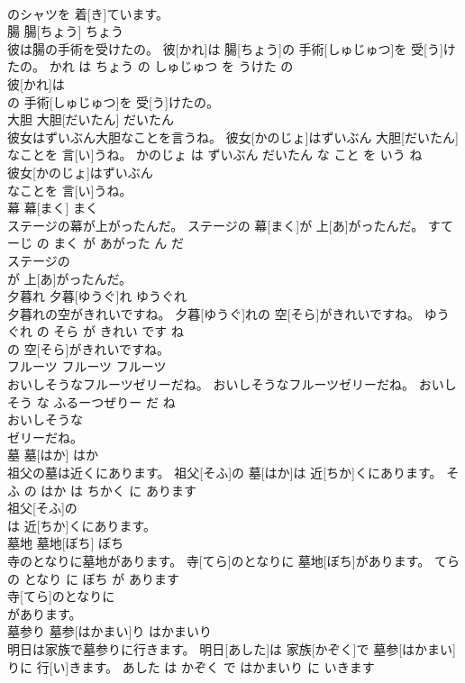 \documentclass[8pt]{extreport}
\begin{document}
\begin{CJK}{UTF8}{min}
\\	のシャツを 着[き]ています。			
\\	腸	腸[ちょう]	ちょう	
\\	彼は腸の手術を受けたの。	彼[かれ]は 腸[ちょう]の 手術[しゅじゅつ]を 受[う]けたの。	かれ は ちょう の しゅじゅつ を うけた の	
\\	彼[かれ]は
\\	の 手術[しゅじゅつ]を 受[う]けたの。			
\\	大胆	大胆[だいたん]	だいたん	
\\	彼女はずいぶん大胆なことを言うね。	彼女[かのじょ]はずいぶん 大胆[だいたん]なことを 言[い]うね。	かのじょ は ずいぶん だいたん な こと を いう ね	
\\	彼女[かのじょ]はずいぶん
\\	なことを 言[い]うね。			
\\	幕	幕[まく]	まく	
\\	ステージの幕が上がったんだ。	ステージの 幕[まく]が 上[あ]がったんだ。	すてーじ の まく が あがった ん だ	
\\	ステージの
\\	が 上[あ]がったんだ。			
\\	夕暮れ	夕暮[ゆうぐ]れ	ゆうぐれ	
\\	夕暮れの空がきれいですね。	夕暮[ゆうぐ]れの 空[そら]がきれいですね。	ゆうぐれ の そら が きれい です ね	
\\	の 空[そら]がきれいですね。			
\\	フルーツ	フルーツ	フルーツ	
\\	おいしそうなフルーツゼリーだね。	おいしそうなフルーツゼリーだね。	おいし そう な ふるーつぜりー だ ね	
\\	おいしそうな
\\	ゼリーだね。			
\\	墓	墓[はか]	はか	
\\	祖父の墓は近くにあります。	祖父[そふ]の 墓[はか]は 近[ちか]くにあります。	そふ の はか は ちかく に あります	
\\	祖父[そふ]の
\\	は 近[ちか]くにあります。			
\\	墓地	墓地[ぼち]	ぼち	
\\	寺のとなりに墓地があります。	寺[てら]のとなりに 墓地[ぼち]があります。	てら の となり に ぼち が あります	
\\	寺[てら]のとなりに
\\	があります。			
\\	墓参り	墓参[はかまい]り	はかまいり	
\\	明日は家族で墓参りに行きます。	明日[あした]は 家族[かぞく]で 墓参[はかまい]りに 行[い]きます。	あした は かぞく で はかまいり に いきます	

\end{CJK}
\end{document}

